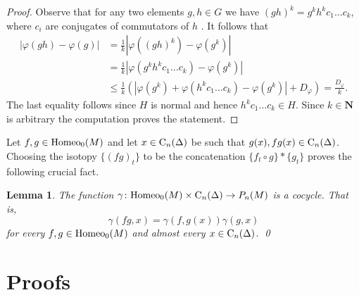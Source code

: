 \documentclass[11pt]{amsart}
\newtheorem{lemma}[subsection]{Lemma}
\theoremstyle{definition}
\theoremstyle{remark}
\numberwithin{equation}{section}
\numberwithin{figure}{section}
\newcommand{\B}[1]{{\mathbf #1}}
\begin{document}
\begin{proof}
Observe that for any two elements $g,h\in G$ we have 
$(gh)^k = g^kh^kc_1\dots c_k$,
where $c_i$ are conjugates of commutators of $h$ \cite[Section 2.2.4]{zbMATH05577332}. 
It follows that
\begin{align*}
|\varphi(gh) - \varphi(g)|
&=\frac{1}{k}\left|\varphi\left( (gh)^k \right)-\varphi(g^k)\right|\\
&=\frac{1}{k}\left|\varphi\left(g^kh^kc_1\dots c_k \right)-\varphi(g^k)\right|\\
&\leq\frac{1}{k}\left( |\varphi(g^k)+\varphi(h^kc_1\dots c_k) -\varphi(g^k) | +D_{\varphi}\right)
=\frac{D_{\varphi}}{k}.
\end{align*}
The last equality follows since $H$ is normal and hence $h^kc_1\dots c_k\in H$. 
Since $k\in \B N$ is arbitrary the computation proves the statement.
\end{proof}

Let $f,g\in {\rm Homeo}_0(M)$ and let $x\in {\rm C}_n(\Delta)$ be such that $g(x),fg(x)\in {\rm C}_n(\Delta)$.
Choosing the isotopy $\{(fg)_t\}$ to be the concatenation $\{f_t\circ g\}*\{g_t\}$ 
proves the following crucial fact.

\begin{lemma}\label{L:}
The function $\gamma\colon {\rm Homeo}_0(M)\times {\rm C}_n(\Delta)\to P_n(M)$ is a cocycle. That is,
$$
\gamma(fg,x) = \gamma(f,g(x))\gamma(g,x)
$$ 
for every $f,g\in {\rm Homeo}_0(M)$ and almost every $x\in {\rm C}_n(\Delta)$.
\qed
\end{lemma}


\section{Proofs}
\end{document}
